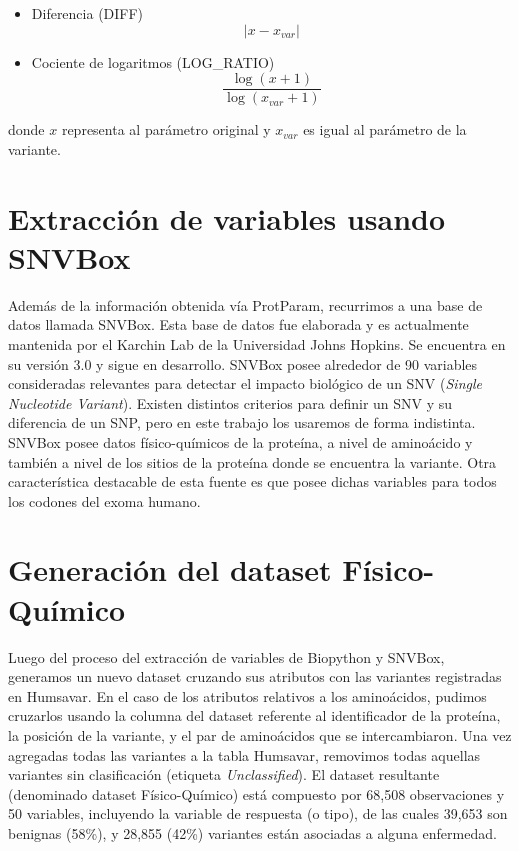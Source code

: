\begin{itemize}
    \item Diferencia (DIFF) 
    $$|x - x_{var}|$$
    \item Cociente de logaritmos (LOG\_RATIO)
    $$\frac{\log{(x + 1)}}{\log{(x_{var} + 1)}}$$  
\end{itemize}

donde $x$ representa al parámetro original y $x_{var}$ es igual al parámetro de la variante.

\section{Extracción de variables usando SNVBox}

Además de la información obtenida vía ProtParam, recurrimos a una base de datos llamada SNVBox. Esta base de datos fue elaborada y es actualmente mantenida por el Karchin Lab de la Universidad Johns Hopkins. Se encuentra en su versión 3.0 y sigue en desarrollo. SNVBox posee alrededor de 90 variables consideradas relevantes para detectar el impacto biológico de un SNV (\textit{Single Nucleotide Variant}). Existen distintos criterios para definir un SNV y su diferencia de un SNP, pero en este trabajo los usaremos de forma indistinta. SNVBox posee datos físico-químicos de la proteína, a nivel de aminoácido y también a nivel de los sitios de la proteína donde se encuentra la variante. Otra característica destacable de esta fuente es que posee dichas variables para todos los codones del exoma humano.

\section{Generación del dataset Físico-Químico}

Luego del proceso del extracción de variables de Biopython y SNVBox, generamos un nuevo dataset cruzando sus atributos con las variantes registradas en Humsavar. En el caso de los atributos relativos a los aminoácidos, pudimos cruzarlos usando la columna del dataset referente al identificador de la proteína, la posición de la variante, y el par de aminoácidos que se intercambiaron. Una vez agregadas todas las variantes a la tabla Humsavar, removimos todas aquellas variantes sin clasificación (etiqueta \textit{Unclassified}). El dataset resultante (denominado dataset Físico-Químico) está compuesto por 68,508 observaciones y 50 variables, incluyendo la variable de respuesta (o tipo), de las cuales 39,653 son benignas (58\%), y 28,855 (42\%) variantes están asociadas a alguna enfermedad. 

